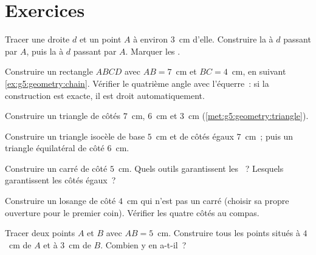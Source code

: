 \section{Exercices}

\begin{exercise}[$\star$]\label{exo:g5:geometry:1}
Tracer une droite $d$ et un point $A$ à environ $3$~cm d'elle.
Construire la  à $d$ passant par $A$, puis la
 à $d$ passant par $A$. Marquer les .
\end{exercise}

\begin{exercise}[$\star$]\label{exo:g5:geometry:2}
Construire un rectangle $ABCD$ avec $AB = 7$~cm et $BC = 4$~cm,
en suivant \cref{ex:g5:geometry:chain}. Vérifier le quatrième angle
avec l'équerre~: si la construction est exacte, il est droit
automatiquement.
\end{exercise}

\begin{exercise}[$\star$]\label{exo:g5:geometry:3}
Construire un triangle de côtés $7$~cm, $6$~cm et $3$~cm
(\cref{met:g5:geometry:triangle}).
\end{exercise}

\begin{exercise}[$\star$]\label{exo:g5:geometry:4}
Construire un triangle isocèle de base $5$~cm et de côtés égaux
$7$~cm~; puis un triangle équilatéral de côté $6$~cm.
\end{exercise}

\begin{exercise}[$\star$]\label{exo:g5:geometry:5}
Construire un carré de côté $5$~cm. Quels outils garantissent les
~? Lesquels garantissent les côtés égaux~?
\end{exercise}

\begin{exercise}[$\star$]\label{exo:g5:geometry:6}
Construire un losange de côté $4$~cm qui n'est pas un carré
(choisir sa propre ouverture pour le premier coin). Vérifier les
quatre côtés au compas.
\end{exercise}

\begin{exercise}[$\star$]\label{exo:g5:geometry:7}
Tracer deux points $A$ et $B$ avec $AB = 5$~cm. Construire tous les
points situés à $4$~cm de $A$ et à $3$~cm de $B$. Combien y en
a-t-il~?
\end{exercise}

